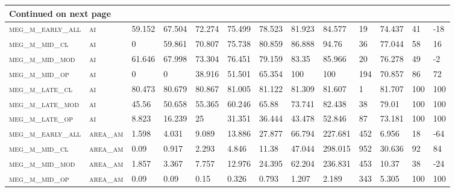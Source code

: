 \begin{landscape}
\begin{center}
\begin{footnotesize}
\begin{longtable}{lllllllllllll}
\hline \multicolumn{13}{|l|}{{Continued on next page}} \\ \hline
\endfoot

\hline \hline
\endlastfoot

\textsc{meg\_m\_early\_all} & \textsc{ai        }   & 59.152   & 67.504   & 72.274   & 75.499   & 78.523   & 81.923   & 84.577   & 19     & 74.437        & 41            & -18             \\
\textsc{meg\_m\_mid\_cl   } & \textsc{ai        }   & 0        & 59.861   & 70.807   & 75.738   & 80.859   & 86.888   & 94.76    & 36     & 77.044        & 58            & 16              \\
\textsc{meg\_m\_mid\_mod  } & \textsc{ai        }   & 61.646   & 67.998   & 73.304   & 76.451   & 79.159   & 83.35    & 85.966   & 20     & 76.278        & 49            & -2              \\
\textsc{meg\_m\_mid\_op   } & \textsc{ai        }   & 0        & 0        & 38.916   & 51.501   & 65.354   & 100      & 100      & 194    & 70.857        & 86            & 72              \\
\textsc{meg\_m\_late\_cl  } & \textsc{ai        }   & 80.473   & 80.679   & 80.867   & 81.005   & 81.122   & 81.309   & 81.607   & 1      & 81.707        & 100           & 100             \\
\textsc{meg\_m\_late\_mod } & \textsc{ai        }   & 45.56    & 50.658   & 55.365   & 60.246   & 65.88    & 73.741   & 82.438   & 38     & 79.01         & 100           & 100             \\
\textsc{meg\_m\_late\_op  } & \textsc{ai        }   & 8.823    & 16.239   & 25       & 31.351   & 36.444   & 43.478   & 52.846   & 87     & 73.181        & 100           & 100             \\
\textsc{meg\_m\_early\_all} & \textsc{area\_am  }   & 1.598    & 4.031    & 9.089    & 13.886   & 27.877   & 66.794   & 227.681  & 452    & 6.956         & 18            & -64             \\
\textsc{meg\_m\_mid\_cl   } & \textsc{area\_am  }   & 0.09     & 0.917    & 2.293    & 4.846    & 11.38    & 47.044   & 298.015  & 952    & 30.636        & 92            & 84              \\
\textsc{meg\_m\_mid\_mod  } & \textsc{area\_am  }   & 1.857    & 3.367    & 7.757    & 12.976   & 24.395   & 62.204   & 236.831  & 453    & 10.37         & 38            & -24             \\
\textsc{meg\_m\_mid\_op   } & \textsc{area\_am  }   & 0.09     & 0.09     & 0.15     & 0.326    & 0.793    & 1.207    & 2.189    & 343    & 5.305         & 100           & 100             \\

\end{longtable}
\end{footnotesize}
\end{center}
\end{landscape}
